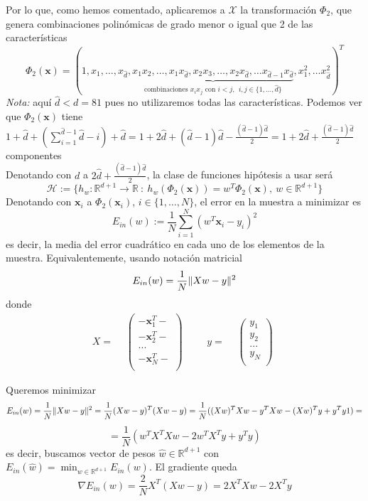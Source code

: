 \documentclass[11pt,a4paper]{article}
\DeclarePairedDelimiter{\norm}{\lVert}{\rVert}
\theoremstyle{definition}
\newcommand{\R}{\mathbb{R}}
\begin{document}
	Por lo que, como hemos comentado, aplicaremos a  $\mathcal{X}$ la transformación $\Phi_2$, que genera combinaciones polinómicas de grado menor o igual que 2 de las características $$\Phi_2(\mathbf{x})=(1,x_1,\ldots, x_{\hat d},\underbrace{x_1x_2,\ldots ,x_1x_{\hat d},x_2x_3,\ldots ,x_2x_{\hat d},  \ldots
	 x_{\hat d-1}x_{\hat d}}_{\text{combinaciones } x_ix_j \text{ con } i<j,\ \  i,j\in \{1,\ldots , \hat d\}}, x_1^2,\ldots x_{\hat d}^2)^T$$
	\textit{Nota:} aquí $\hat d< d=81$ pues no utilizaremos todas las características. Podemos ver que $\Phi_2(\mathbf{x})$ tiene $1+\hat d  + (\sum_{i=1}^{\hat d-1} \hat d -i) + \hat d  = 1 + 2\hat d + (\hat d -1)\hat d - \frac{(\hat d -1)\hat d}{2}=1+2\hat d + \frac{(\hat d -1)\hat d}{2}$ componentes\\
	
	Denotando con $d$ a $2\hat d + \frac{(\hat d -1)\hat d}{2}$, la clase de funciones hipótesis a usar será
	$$\mathcal{H}:=\{h_w\colon \R^{d+1} \to \R \ : \ h_w(\Phi_2(\mathbf{x}))=w^T\Phi_2(\mathbf{x}),\ w \in \R^{d+1}\}$$
	Denotando con $\mathbf{x}_i$ a $\Phi_2(\mathbf{x}_i)$, $i\in \{1,\ldots , N\}$, el error en la muestra a minimizar es
	$$E_{in} (w):=\frac{1}{N}\sum_{i=1}^N(w^T\mathbf{x}_i-y_i)^2$$
	es decir, la media del error cuadrático en cada uno de los elementos de la muestra. Equivalentemente, usando notación matricial
	$$E_{in}(w)=\frac{1}{N}\norm{Xw-y}^2$$
	donde
	$$
	X=\begin{matrix}
	& \left(\begin{matrix}
	- \mathbf{x}_1^T - \\
	- \mathbf{x}_2^T - \\
	...  \\
	- \mathbf{x}_N^T - \\


	\end{matrix}\right)
	\end{matrix}
		\quad \quad 
	y=\begin{matrix}
	& \left(\begin{matrix}
	y_1 \\
	y_2 \\
	...  \\
	y_N  \\


	\end{matrix}\right)
	\end{matrix}
	$$
	
	Queremos minimizar
	$$E_{in}(w)=\frac{1}{N}\norm{Xw-y}^2=\frac{1}{N}(Xw-y)^T(Xw-y)=\frac{1}{N}((Xw)^TXw-y^TXw-(Xw)^Ty+y^Ty1)=$$ $$=\frac{1}{N} (w^TX^TXw-2w^TX^Ty+y^Ty)$$
	es decir, buscamos vector de pesos $\hat w \in \R^{d+1}$ con $E_{in}(\hat w)=\min_{w\in \R^{d+1}} E_{in}(w)$. El gradiente queda 
	$$\nabla E_{in}(w)=\frac{2}{N} X^T (Xw-y)=2X^TXw-2X^Ty$$ ~\\
	
\end{document}
